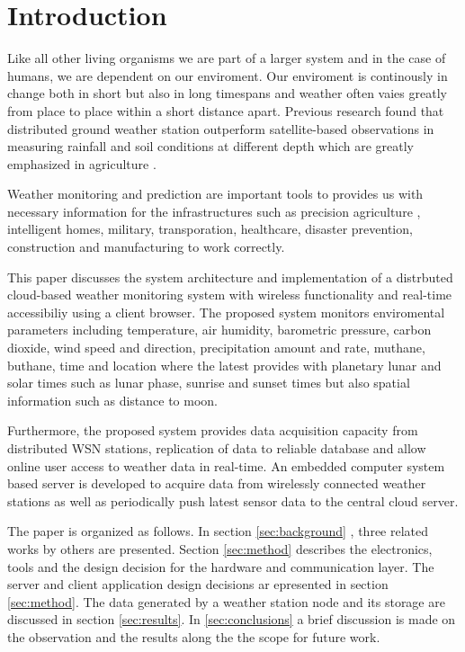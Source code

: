 \section{Introduction}
\label{sec:introduction}
Like all other living organisms we are part of a larger system and in the case of
humans, we are dependent on our enviroment. Our enviroment is continously in change
both in short but also in long timespans and weather often vaies greatly from
place to place within a short distance apart. Previous research found that
distributed ground weather station outperform satellite-based observations
in measuring rainfall and soil conditions at different depth which are greatly
emphasized in agriculture \cite{Mendelsohn2007}.

Weather monitoring and prediction are important tools to provides us with necessary information for the
infrastructures such as precision agriculture \cite{6878963}, intelligent homes,
military, transporation, healthcare, disaster prevention, construction and manufacturing to work correctly.


This paper discusses the system architecture and implementation of a distrbuted cloud-based weather monitoring system with wireless functionality and
real-time accessibiliy using a client browser. The proposed system monitors enviromental parameters including
temperature, air humidity, barometric pressure, carbon dioxide, wind speed and direction, precipitation amount
and rate, muthane, buthane, time and location where the latest provides with planetary lunar and solar times such
as lunar phase, sunrise and sunset times but also spatial information such as distance to moon.

Furthermore, the proposed system provides data acquisition capacity from distributed WSN stations,
replication of data to reliable database and allow online user access to weather data in real-time.
An embedded computer system based server is developed to acquire data from wirelessly connected weather
stations as well as periodically push latest sensor data to the central cloud server.

The paper is organized as follows. In section \ref{sec:background}
, three related works by others are presented. Section \ref{sec:method} describes the electronics, tools and the design decision for the hardware and communication layer. The server and client application design decisions ar epresented in section \ref{sec:method}.
 The data generated by a weather station node and its storage are discussed in section \ref{sec:results}.
 In \ref{sec:conclusions} a brief discussion is made on the observation and the results along the the scope for future work. 
